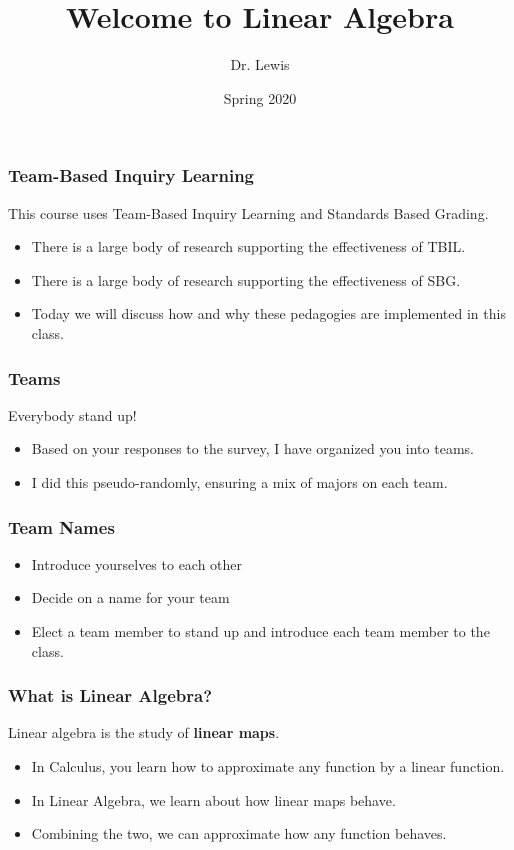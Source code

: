 \documentclass[aspectration=1610]{beamer}
\title{Welcome to Linear Algebra}
\author{Dr. Lewis}
\date{Spring 2020}
\begin{document}
\begin{frame}
\titlepage
\end{frame}

\begin{frame}\frametitle{Team-Based Inquiry Learning}
This course uses Team-Based Inquiry Learning and Standards Based Grading.
\begin{itemize}
	\item There is a large body of research supporting the effectiveness of TBIL.
	\item There is a large body of research supporting the effectiveness of SBG.
	\item Today we will discuss how and why these pedagogies are implemented in this class.
\end{itemize}
  
\end{frame}
 
\begin{frame}\frametitle{Teams}
Everybody stand up!
  
\begin{itemize}
\item Based on your responses to the survey, I have organized you into teams.
\item I did this pseudo-randomly, ensuring a mix of majors on each team.
\end{itemize}
\end{frame}

\begin{frame}\frametitle{Team Names}
\begin{itemize}
\item Introduce yourselves to each other
\item Decide on a name for your team
\item Elect a team member to stand up and introduce each team member to the class.

\end{itemize}
\end{frame}






\begin{frame} \frametitle{What is Linear Algebra? }
Linear algebra is the study of {\bf linear maps}.
\begin{itemize}
\item In Calculus, you learn how to approximate any function by a linear function.
\item In Linear Algebra, we learn about how linear maps behave.
\item Combining the two, we can approximate how any function behaves.
\end{itemize}
\end{frame}
\end{document}
